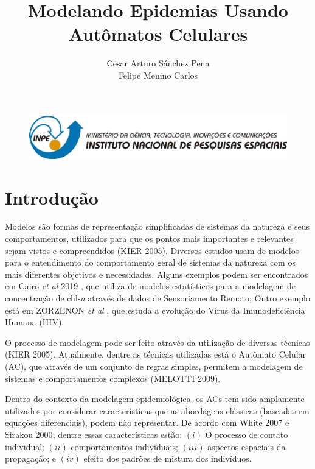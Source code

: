 \documentclass[a4paper,12pt]{article}
\begin{document}
\begin{figure}
 \begin{center}
  \includegraphics[width=1\linewidth]{fig/logoinpe.png}
 \end{center}
\end{figure}

\setlength{\textfloatsep}{0pt}

\title{Modelando Epidemias Usando Autômatos Celulares}
    
\author{Cesar Arturo Sánchez Pena \\ Felipe Menino Carlos}
\date{}

\maketitle

\section{Introdução}

Modelos são formas de representação simplificadas de sistemas da natureza e seus comportamentos, utilizados para que os pontos mais importantes e relevantes sejam vistos e compreendidos (KIER 2005\cite{Kier2005}). Diversos estudos usam de modelos para o entendimento do comportamento geral de sistemas da natureza com os mais diferentes objetivos e necessidades. Alguns exemplos podem ser encontrados em Cairo \textit{et al} 2019 \cite{Cairo2019}, que utiliza de modelos estatísticos para a modelagem de concentração de chl-\textit{a} através de dados de Sensoriamento Remoto; Outro exemplo está em ZORZENON \textit{et al} \cite{ZorzenonDosSantos2001}, que estuda a evolução do Vírus da Imunodeficiência Humana (HIV). %

O processo de modelagem pode ser feito através da utilização de diversas técnicas (KIER 2005\cite{Kier2005}). Atualmente, dentre as técnicas utilizadas está o Autômato Celular (AC), que através de um conjunto de regras simples, permitem a modelagem de sistemas e comportamentos complexos (MELOTTI 2009\cite{Melotti2009}). %

Dentro do contexto da modelagem epidemiológica, os ACs tem sido amplamente utilizados por considerar características que as abordagens clássicas (baseadas em equações diferenciais), podem não representar. De acordo com White 2007 \cite{White2007} e Sirakou 2000\cite{Sirakoulis2000}, dentre essas características estão: $(i)$ O processo de contato individual; $(ii)$ comportamentos individuais; $(iii)$ aspectos espaciais da propagação; e $(iv)$ efeito dos padrões de mistura dos indivíduos. %
\end{document}
